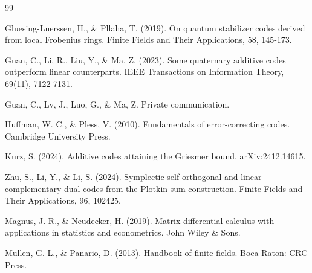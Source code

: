 \documentclass[a4paper,12pt]{article}
\theoremstyle{plain}
\theoremstyle{definition}
\begin{document}
\begin{thebibliography}{99}

 Gluesing-Luerssen, H., \& Pllaha, T. (2019). On quantum stabilizer codes derived from local Frobenius rings. Finite Fields and Their Applications, 58, 145-173.

 Guan, C., Li, R., Liu, Y., \& Ma, Z. (2023). Some quaternary additive codes outperform linear counterparts. IEEE Transactions on Information Theory, 69(11), 7122-7131.


Guan, C., Lv, J., Luo, G., \& Ma, Z. Private communication.



Huffman, W. C., \& Pless, V. (2010). Fundamentals of error-correcting codes. Cambridge University Press.



Kurz, S. (2024). Additive codes attaining the Griesmer bound.  arXiv:2412.14615.



 Zhu, S., Li, Y., \& Li, S. (2024). Symplectic self-orthogonal and linear complementary dual codes from the Plotkin sum construction. Finite Fields and Their Applications, 96, 102425.

Magnus, J. R., \& Neudecker, H. (2019). Matrix differential calculus with applications in statistics and econometrics. John Wiley \& Sons.

 Mullen, G. L., \& Panario, D. (2013). Handbook of finite fields. Boca Raton: CRC Press.




\end{thebibliography}





 
\end{document}
